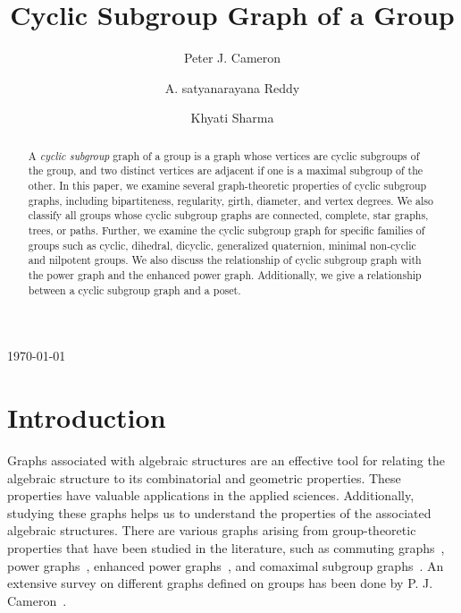 \documentclass[11pt,twoside]{amsart}
\date{}
\begin{document}
\title{Cyclic Subgroup Graph of a Group}
\author{Peter J. Cameron}
	\address{School of Mathematics and Statistics, University of St Andrews, Fife KY16 9SS, U.K.}
	\author{A. satyanarayana Reddy}
	\address{Shiv Nadar Institution of Eminence, NH-91, Dadri, Gautam Buddha Nagar}
    
	\author{Khyati Sharma}
	\address{Shiv Nadar Institution of Eminence, NH-91, Dadri, Gautam Buddha Nagar}
	
	
	\today 

\begin{abstract}
   A {\em cyclic subgroup} graph of a group is a graph whose vertices are cyclic subgroups of the group, and two distinct vertices are adjacent if one is a maximal subgroup of the other. In this paper, we examine several graph-theoretic properties of cyclic subgroup graphs, including bipartiteness, regularity, girth, diameter, and vertex degrees. We also classify all groups whose cyclic subgroup graphs are connected, complete, star graphs, trees, or paths. Further, we examine the cyclic subgroup graph for specific families of groups such as cyclic, dihedral, dicyclic, generalized quaternion, minimal non-cyclic and nilpotent groups. We also discuss the relationship of cyclic subgroup graph with the power graph and the enhanced power graph. Additionally, we give a relationship between a cyclic subgroup graph and a poset.
\end{abstract}
\maketitle
\section{Introduction}\label{sec1}
Graphs associated with algebraic structures are
an effective tool for relating the algebraic structure to its combinatorial and geometric properties. These properties have valuable applications in the applied sciences. Additionally, studying these graphs helps us to understand the properties of the associated algebraic structures. There are various graphs arising from group-theoretic properties that have been studied in the literature, such as commuting graphs~\cite{akbari2004commuting}, power graphs~\cite{Chakrabarty2009,kumar2021recent}, enhanced power graphs~\cite{AalipourEtAl2017,bera2022proper,bera2021connectivity}, and comaximal subgroup graphs~\cite{Akbari_Miraftab_Nikandish_2017,das2024co,das2025co}. An extensive survey on different graphs defined on groups has been done by P. J. Cameron~\cite{PaterCameron}.
\end{document}
